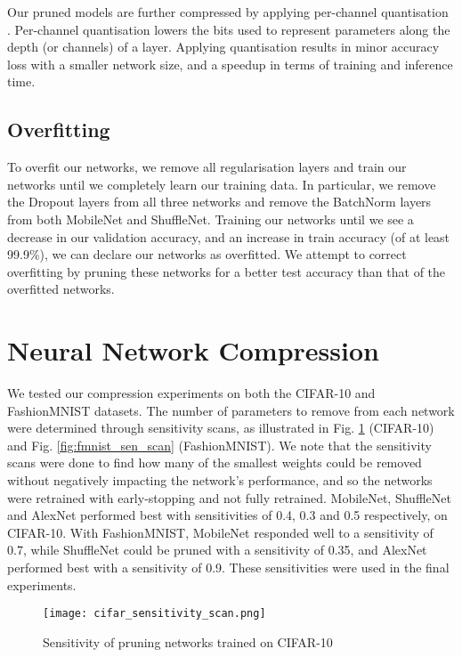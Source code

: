 \documentclass[conference]{IEEEtran}
\begin{document}
Our pruned models are further compressed by applying per-channel quantisation \cite{krishnamoorthi2018quantizing}. Per-channel quantisation lowers the bits used to represent parameters along the depth (or channels) of a layer. Applying quantisation results in minor accuracy loss with a smaller network size, and a speedup in terms of training and inference time.


\subsection{Overfitting}
To overfit our networks, we remove all regularisation layers and train our networks until we completely learn our training data. In particular, we remove the Dropout layers from all three networks and remove the BatchNorm layers from both MobileNet and ShuffleNet. Training our networks until we see a decrease in our validation accuracy, and an increase in train accuracy (of at least 99.9\%), we can declare our networks as overfitted. We attempt to correct overfitting by pruning these networks for a better test accuracy than that of the overfitted networks. 




\section{Neural Network Compression}
We tested our compression experiments on both the CIFAR-10 and FashionMNIST datasets. The number of parameters to remove from each network were determined through sensitivity scans, as illustrated in Fig. \ref{fig:cifar_sen_scan} (CIFAR-10) and Fig. \ref{fig:fmnist_sen_scan} (FashionMNIST). We note that the sensitivity scans were done to find how many of the smallest weights could be removed without negatively impacting the network's performance, and so the networks were retrained with early-stopping and not fully retrained. 
MobileNet, ShuffleNet and AlexNet performed best with sensitivities of 0.4, 0.3 and 0.5 respectively, on CIFAR-10. With FashionMNIST, MobileNet responded well to a sensitivity of 0.7, while ShuffleNet could be pruned with a sensitivity of 0.35, and AlexNet performed best with a sensitivity of 0.9. These sensitivities were used in the final experiments.
  \begin{figure}[b!]
      \centering
      \texttt{[image: cifar\_sensitivity\_scan.png]}
      \caption{Sensitivity of pruning networks trained on CIFAR-10}
      \label{fig:cifar_sen_scan}
  \end{figure}
\end{document}
